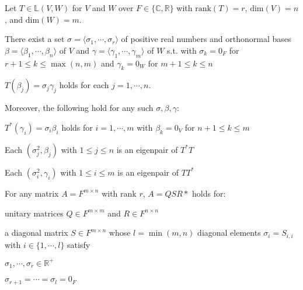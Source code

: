 \documentclass[9pt, twocolumn]{extarticle}
\newcommand{\vsdim}{\ensuremath{\text{dim}}}
\newcommand{\rank}{\ensuremath{\text{rank}}}
\newcommand{\realnum}{\mathbb{R}}
\newcommand{\complexnum}{\mathbb{C}}
\newcommand{\ltrans}{\mathbb{L}}
\begin{document}
\begin{description}
    \item[6.26 奇異值定理] Let $T \in \ltrans(V, W)$ for $V$ and $W$ over $F \in \{\complexnum, \realnum\}$ with $\rank(T)=r$, $\vsdim(V) = n$, and $\vsdim(W) = m$.
        \begin{enumerate*}[label=({\alph*})]
            \item There exist a set $\sigma = \langle \sigma_1, \cdots, \sigma_r \rangle$ of positive real numbers and orthonormal bases $\beta  = \langle \beta_1, \cdots , \beta_n \rangle$ of $V$ and $\gamma = \langle \gamma_1, \cdots , \gamma_m \rangle$ of $W$ s.t. with $\sigma_k = 0_F$ for $r+1 \leq k \leq \max(n, m)$ and $\gamma_k = 0_W$ for $m+1 \leq k \leq n$ 
                \begin{enumerate*}[label={\arabic*}.]
                    \item $T(\beta_j) = \sigma_j \gamma_j$ holds for each $j = 1, \cdots, n$. 
                \end{enumerate*}
            \item Moreover, the following hold for any such $\sigma,\beta,\gamma$:
                \begin{enumerate*}[label={\arabic*}.]
                        \setcounter{enumii}{1}
                        \item $T^*(\gamma_i) = \sigma_i \beta_i$ holds for $i = 1,\cdots, m$ with $\beta_k = 0_V$ for $n+1 \leq k \leq m$
                        \item Each $(\sigma^2_j, \beta_j)$ with $1 \leq j \leq n$ is an eigenpair of $T^*T$
                        \item Each $(\sigma^2_i, \gamma_i)$ with $1 \leq i \leq m$ is an eigenpair of $TT^*$
                \end{enumerate*}
        \end{enumerate*}
    \item[6.27 SVD] For any matrix $A = F^{m\times n}$ with rank $r$, $A = QSR*$ holds for: 
        \begin{itemize*}
            \item unitary matrices $Q \in F^{m\times m}$ and $R \in F^{n\times n}$
            \item a diagonal matrix $S \in F^{m\times n}$ whose $l = \min (m, n)$ diagonal elements $\sigma_i = S_{i, i}$ with $i \in \{1,\cdots ,l\}$ satisfy 
                \begin{enumerate*}
                    \item $\sigma_1, \cdots , \sigma_r \in \realnum^+$
                    \item $\sigma_{r+1} = \cdots = \sigma_l = 0_F$
                \end{enumerate*}
        \end{itemize*}
        

\end{description}
\end{document}

